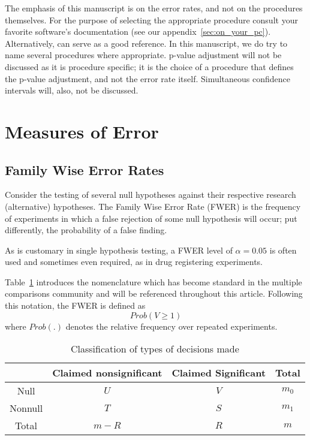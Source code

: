 \documentclass[review,12pt]{article}
\begin{document}
The emphasis of this manuscript is on the error rates, and not on the procedures themselves. For the purpose of selecting the appropriate procedure consult your favorite software's documentation (see our appendix~\ref{sec:on_your_pc}). Alternatively, \citet{farcomeni_review_2008} can serve as a good reference. 
In this manuscript, we do try to name several procedures  where appropriate.  p-value adjustment will not be discussed as it is procedure specific; it is the choice of a procedure that defines the p-value adjustment, and not the error rate itself.
Simultaneous confidence intervals will, also, not be discussed.  


\section{\label{sec:measures_of_error}Measures of Error}

\subsection{Family Wise Error Rates}
Consider the testing of several null hypotheses against their respective research (alternative) hypotheses. The Family Wise Error Rate (FWER) is the frequency of experiments in which a false rejection of some null hypothesis will occur; put differently, the probability of a false finding.

As is customary in single hypothesis testing, a FWER level of $\alpha=0.05$ is often used and sometimes even required, as in drug registering experiments.




Table~\ref{tab:event_notation} introduces the nomenclature which has become standard in the multiple comparisons community and will be referenced throughout this article. Following this notation, the FWER is defined as $$Prob(V \geq 1 )$$ where $Prob(.)$ denotes the relative frequency over repeated experiments.



\begin{table}[h]
  \centering
\begin{tabular}{|c|c|c|c|}
\hline \rule[-1ex]{0pt}{1.5ex} & Claimed nonsignificant & Claimed Significant & Total \\ 
\hline
\hline \rule[-1ex]{0pt}{1.5ex} Null & $U$ & $V$ & $m_0$ \\ 
\hline \rule[-1ex]{0pt}{1.5ex} Nonnull & $T$ & $S$ & $m_1$ \\ 
\hline \rule[-1ex]{0pt}{1.5ex} Total & $m-R$ & $R$ & $m$ \\ 
\hline 
\end{tabular} 
  \caption{Classification of types of decisions made}
  \label{tab:event_notation}
\end{table}
\end{document}
